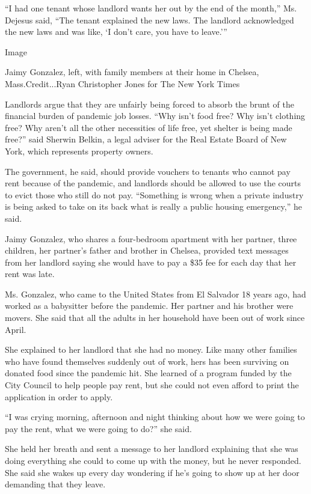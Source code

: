 ``I had one tenant whose landlord wants her out by the end of the
month,'' Ms. Dejesus said, ``The tenant explained the new laws. The
landlord acknowledged the new laws and was like, `I don't care, you have
to leave.'''

Image

Jaimy Gonzalez, left, with family members at their home in Chelsea,
Mass.Credit...Ryan Christopher Jones for The New York Times

Landlords argue that they are unfairly being forced to absorb the brunt
of the financial burden of pandemic job losses. ``Why isn't food free?
Why isn't clothing free? Why aren't all the other necessities of life
free, yet shelter is being made free?'' said Sherwin Belkin, a legal
adviser for the Real Estate Board of New York, which represents property
owners.

The government, he said, should provide vouchers to tenants who cannot
pay rent because of the pandemic, and landlords should be allowed to use
the courts to evict those who still do not pay. ``Something is wrong
when a private industry is being asked to take on its back what is
really a public housing emergency,'' he said.

Jaimy Gonzalez, who shares a four-bedroom apartment with her partner,
three children, her partner's father and brother in Chelsea, provided
text messages from her landlord saying she would have to pay a \$35 fee
for each day that her rent was late.

Ms. Gonzalez, who came to the United States from El Salvador 18 years
ago, had worked as a babysitter before the pandemic. Her partner and his
brother were movers. She said that all the adults in her household have
been out of work since April.

She explained to her landlord that she had no money. Like many other
families who have found themselves suddenly out of work, hers has been
surviving on donated food since the pandemic hit. She learned of a
program funded by the City Council to help people pay rent, but she
could not even afford to print the application in order to apply.

``I was crying morning, afternoon and night thinking about how we were
going to pay the rent, what we were going to do?'' she said.

She held her breath and sent a message to her landlord explaining that
she was doing everything she could to come up with the money, but he
never responded. She said she wakes up every day wondering if he's going
to show up at her door demanding that they leave.

